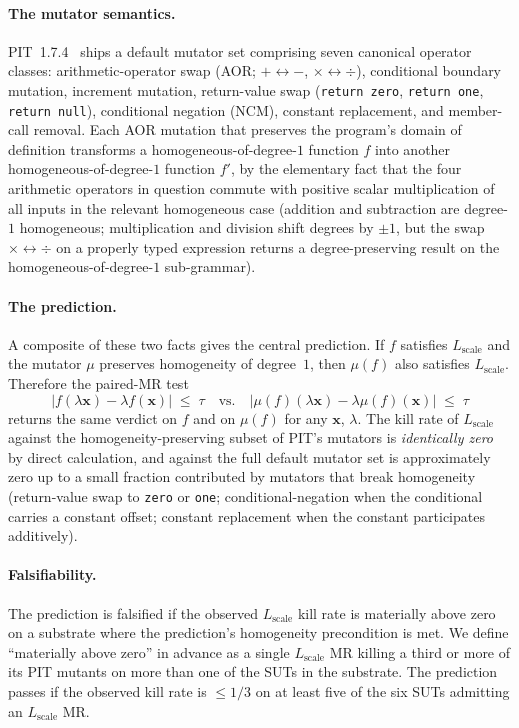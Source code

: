 \paragraph{The mutator semantics.}
PIT~1.7.4~\cite{Coles2016PIT} ships a default mutator set comprising
seven canonical operator classes: arithmetic-operator swap (AOR;
$+ \leftrightarrow -$, $\times \leftrightarrow \div$), conditional
boundary mutation, increment mutation, return-value swap (\texttt{return zero},
\texttt{return one}, \texttt{return null}), conditional negation
(NCM), constant replacement, and member-call removal. Each AOR
mutation that preserves the program's domain of definition transforms
a homogeneous-of-degree-$1$ function $f$ into another
homogeneous-of-degree-$1$ function $f'$, by the elementary fact that
the four arithmetic operators in question commute with positive
scalar multiplication of all inputs in the relevant homogeneous case
(addition and subtraction are degree-$1$ homogeneous; multiplication
and division shift degrees by $\pm 1$, but the swap $\times
\leftrightarrow \div$ on a properly typed expression returns a
degree-preserving result on the homogeneous-of-degree-$1$
sub-grammar).

\paragraph{The prediction.}
A composite of these two facts gives the central prediction. If $f$
satisfies $L_{\mathrm{scale}}$ and the mutator $\mu$ preserves
homogeneity of degree~$1$, then $\mu(f)$ also satisfies
$L_{\mathrm{scale}}$. Therefore the paired-MR test
\begin{equation*}
\big| f(\lambda \mathbf{x}) - \lambda f(\mathbf{x}) \big| \;\le\; \tau
\quad \mathrm{vs.} \quad
\big| \mu(f)(\lambda \mathbf{x}) - \lambda \mu(f)(\mathbf{x}) \big| \;\le\; \tau
\end{equation*}
returns the same verdict on $f$ and on $\mu(f)$ for any
$\mathbf{x}$, $\lambda$. The kill rate of $L_{\mathrm{scale}}$ against
the homogeneity-preserving subset of PIT's mutators is
\emph{identically zero} by direct calculation, and against the full
default mutator set is approximately zero up to a small fraction
contributed by mutators that break homogeneity (return-value swap to
\texttt{zero} or \texttt{one}; conditional-negation when the
conditional carries a constant offset; constant replacement when the
constant participates additively).

\paragraph{Falsifiability.}
The prediction is falsified if the observed
$L_{\mathrm{scale}}$ kill rate is materially above zero on a substrate
where the prediction's homogeneity precondition is met. We define
``materially above zero'' in advance as a single $L_{\mathrm{scale}}$
MR killing a third or more of its PIT mutants on more than one of the
SUTs in the substrate. The prediction passes if the observed kill
rate is $\le 1/3$ on at least five of the six SUTs admitting an
$L_{\mathrm{scale}}$ MR.

